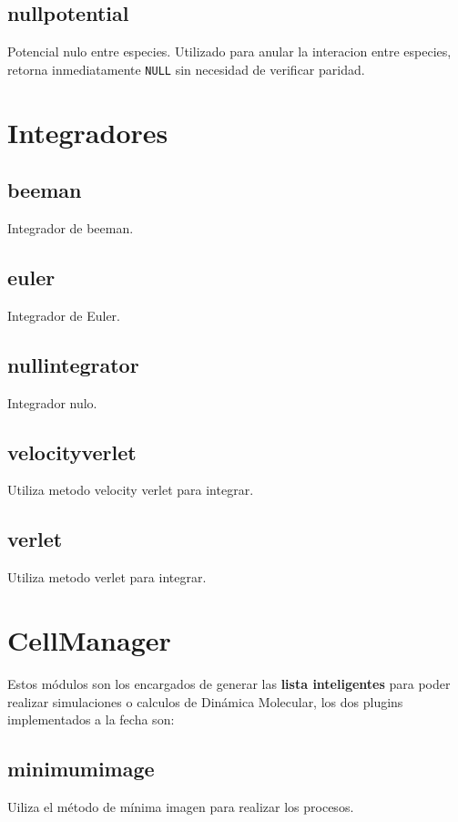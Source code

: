 \documentclass[a4paper,10pt]{scrbook}
\begin{document}
\subsection{nullpotential}
Potencial nulo entre especies. Utilizado para anular la interacion entre especies, retorna inmediatamente \verb|NULL| sin necesidad de verificar paridad.

\section{Integradores}
\subsection{beeman}
Integrador de beeman.
\subsection{euler}
Integrador de Euler.
\subsection{nullintegrator}
Integrador nulo.
\subsection{velocityverlet}
Utiliza metodo velocity verlet para integrar.
\subsection{verlet}
Utiliza metodo verlet para integrar.

\section{CellManager}
Estos m\'odulos son los encargados de generar las \textbf{lista inteligentes} para poder realizar simulaciones o calculos de Din\'amica Molecular, los dos plugins implementados a la fecha son:

\subsection{minimumimage}
Uiliza el m\'etodo de m\'inima imagen para realizar los procesos.
\end{document}

